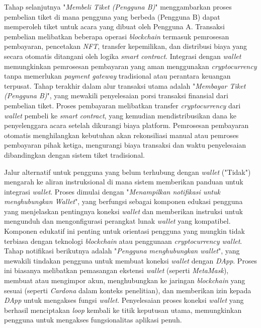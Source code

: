 Tahap selanjutnya "\emph{Membeli Tiket (Pengguna B)}" menggambarkan proses
pembelian tiket di mana pengguna yang berbeda (Pengguna B) dapat memperoleh
tiket untuk acara yang dibuat oleh Pengguna A. Transaksi pembelian melibatkan
beberapa operasi \emph{blockchain} termasuk pemrosesan pembayaran, pencetakan
\emph{NFT}, transfer kepemilikan, dan distribusi biaya yang secara otomatis
ditangani oleh logika \emph{smart contract}. Integrasi dengan \emph{wallet}
memungkinkan pemrosesan pembayaran yang aman menggunakan \emph{cryptocurrency}
tanpa memerlukan \emph{payment gateway} tradisional atau perantara keuangan
terpusat. Tahap terakhir dalam alur transaksi utama adalah "\emph{Membayar
    Tiket (Pengguna B)}", yang mewakili penyelesaian porsi transaksi finansial dari
pembelian tiket. Proses pembayaran melibatkan transfer \emph{cryptocurrency}
dari \emph{wallet} pembeli ke \emph{smart contract}, yang kemudian
mendistribusikan dana ke penyelenggara acara setelah dikurangi biaya platform.
Pemrosesan pembayaran otomatis menghilangkan kebutuhan akan rekonsiliasi manual
atau pemroses pembayaran pihak ketiga, mengurangi biaya transaksi dan waktu
penyelesaian dibandingkan dengan sistem tiket tradisional.

Jalur alternatif untuk pengguna yang belum terhubung dengan \emph{wallet}
("Tidak") mengarah ke aliran instruksional di mana sistem memberikan panduan
untuk integrasi \emph{wallet}. Proses dimulai dengan "\emph{Menampilkan
    notifikasi untuk menghubungkan Wallet}", yang berfungsi sebagai komponen
edukasi pengguna yang menjelaskan pentingnya koneksi \emph{wallet} dan
memberikan instruksi untuk mengunduh dan mengonfigurasi perangkat lunak
\emph{wallet} yang kompatibel. Komponen edukatif ini penting untuk orientasi
pengguna yang mungkin tidak terbiasa dengan teknologi \emph{blockchain} atau
penggunaan \emph{cryptocurrency wallet}. Tahap notifikasi berikutnya adalah
"\emph{Pengguna menghubungkan wallet}", yang mewakili tindakan pengguna untuk
membuat koneksi \emph{wallet} dengan \emph{DApp}. Proses ini biasanya
melibatkan pemasangan ekstensi \emph{wallet} (seperti \emph{MetaMask}), membuat
atau mengimpor akun, menghubungkan ke jaringan \emph{blockchain} yang sesuai
(seperti \emph{Cardona} dalam konteks penelitian), dan memberikan izin kepada
\emph{DApp} untuk mengakses fungsi \emph{wallet}. Penyelesaian proses koneksi
\emph{wallet} yang berhasil menciptakan \emph{loop} kembali ke titik keputusan
utama, memungkinkan pengguna untuk mengakses fungsionalitas aplikasi penuh.

